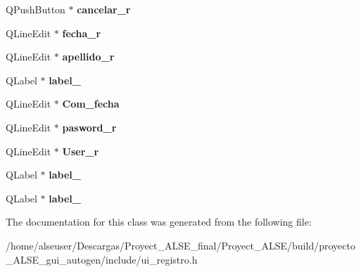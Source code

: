 \begin{DoxyCompactItemize}
Q\+Push\+Button $\ast$ {\bfseries cancelar\+\_\+r}
\item 
\mbox{\label{class_ui__registro_ab52a49005a5c2321bf0548e857fce550}} 
Q\+Line\+Edit $\ast$ {\bfseries fecha\+\_\+r}
\item 
\mbox{\label{class_ui__registro_a424368ae2a7ca67cbd0139b63db50435}} 
Q\+Line\+Edit $\ast$ {\bfseries apellido\+\_\+r}
\item 
\mbox{\label{class_ui__registro_aae27d1f2c608740c0153a9e0477e9944}} 
Q\+Label $\ast$ {\bfseries label\+\_}
\item 
\mbox{\label{class_ui__registro_a2e63263b02c60fc2a089893c651daf53}} 
Q\+Line\+Edit $\ast$ {\bfseries Com\+\_\+fecha}
\item 
\mbox{\label{class_ui__registro_ab6d06916f3d816934ad5b656ed33af37}} 
Q\+Line\+Edit $\ast$ {\bfseries pasword\+\_\+r}
\item 
\mbox{\label{class_ui__registro_a2f231c4f6b1a0012c5b77c2265983d81}} 
Q\+Line\+Edit $\ast$ {\bfseries User\+\_\+r}
\item 
\mbox{\label{class_ui__registro_a936008048ab955b86177c680bb580bdc}} 
Q\+Label $\ast$ {\bfseries label\+\_}
\item 
\mbox{\label{class_ui__registro_a851df2843214b8e05fdd63989dc279a1}} 
Q\+Label $\ast$ {\bfseries label\+\_}
\end{DoxyCompactItemize}


The documentation for this class was generated from the following file\+:\begin{DoxyCompactItemize}
\item 
/home/alseuser/\+Descargas/\+Proyect\+\_\+\+A\+L\+S\+E\+\_\+final/\+Proyect\+\_\+\+A\+L\+S\+E/build/proyecto\+\_\+\+A\+L\+S\+E\+\_\+gui\+\_\+autogen/include/ui\+\_\+registro.\+h\end{DoxyCompactItemize}
